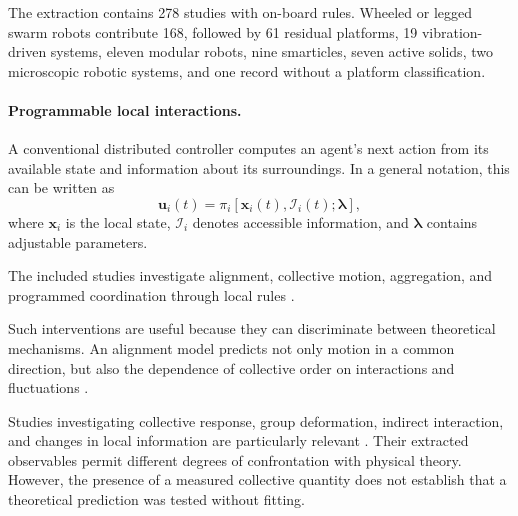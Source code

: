 The extraction contains 278 studies with on-board
rules. Wheeled or legged swarm robots contribute
168, followed by 61 residual platforms,
19 vibration-driven systems, eleven modular
robots, nine smarticles, seven active solids,
two microscopic robotic systems, and one
record without a platform classification.

\paragraph*{Programmable local interactions.}

A conventional distributed controller computes
an agent's next action from its available state
and information about its surroundings. In a
general notation, this can be written as
\begin{equation}
\mathbf u_i(t)=
\pi_i\!\left[
\mathbf x_i(t),
\mathcal I_i(t);
\boldsymbol{\lambda}
\right],
\label{eq:control-onboard-policy}
\end{equation}
where $\mathbf x_i$ is the local state,
$\mathcal I_i$ denotes accessible information,
and $\boldsymbol{\lambda}$ contains
adjustable parameters.

The included studies investigate alignment,
collective motion, aggregation, and programmed
coordination through local rules
\cite{Miki2010asimplerulebased,Chen2013aflockingalgorithm,Wang2021fielddriverobotsw,Fruchart2022nonreciprocalphase,Yang2023collectivechaseem,Paramanick2024emergenceofrunand,Kernbach2011threecasesofconne,Tran2022frontierledswarmin,Giardina2022collectivephototact,Vega2023simulatelessexpec,Vega2023indirectswarmcontr,Vega2024agentbasedemulatio,Varadharajan2026programmableflocks,Gao2023robustdistributedc,Lee2022distributedcohesive,Garnier2005aggregationbehaviou,Baumann2024hybridflockforma,Guzzi2014bioinspiredobstacle,Turgut2008modelingphasetrans,Navarro2008anapproachtoflock,Ercan2011swarmrobotflocking,Ferrante2013aselfadaptivecomm,Turgut2008selforganizedflocka,Vsrhelyi2018optimizedflockingo}.

Such interventions are useful because they
can discriminate between theoretical
mechanisms. An alignment model predicts
not only motion in a common direction,
but also the dependence of collective
order on interactions and fluctuations
\cite{Vicsek1995novel}
\cite{Toner1995longrange}.

Studies investigating collective response,
group deformation, indirect interaction,
and changes in local information are
particularly relevant
\cite{Li2016turinglearningam,Lee2022distributeddeformab,Karagzel2022collectivegradient,Zhang2022collectivefissionb,Xiao2023perceptionofmotion,Zheng2024bodyorientationcha,Zheng2026nestedinteractionn,Zhou2021collectivesynchroni,Mijalkov2016engineeringsensoria,Noirhomme2024brainbotsassmarta,Paramanick2025spontaneousemergenc,Barone2024experimentalandnum,Zhou2025activesearchpromot,Liu2026noiseenabledgoala,Dizenhaus2026anonymousleadership,Wang2025hyperuniformnetwork}.
Their extracted observables permit different
degrees of confrontation with physical theory.
However, the presence of a measured collective
quantity does not establish that a theoretical
prediction was tested without fitting.

